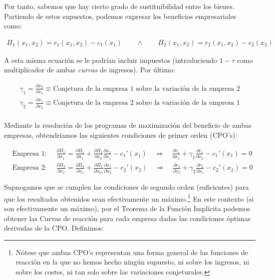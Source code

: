\documentclass[10pt,a4paper]{article}
\begin{document}
Por tanto, sabemos que hay cierto grado de sustituibilidad entre los bienes. Partiendo de estos supuestos, podemos expresar los beneficios empresariales como: 

$$\begin{aligned}
    \Pi_1(x_1,x_2)=r_1(x_1,x_2)-c_1(x_1)\qquad \wedge\qquad\Pi_2(x_1,x_2)=r_2(x_1,x_2)-c_2(x_2)
\end{aligned}$$

A esta misma ecuación se le podrían incluir impuestos (introduciendo $1-\tau$ como multiplicador de ambas \textit{curvas} de ingresos). Por último:

$$\begin{aligned}
    \gamma_1=\frac{\partial x_2}{\partial x_1}\equiv \text{Conjetura de la empresa 1 sobre la variación de la empresa 2}\\[1em]
    \gamma_2=\frac{\partial x_1}{\partial x_2}\equiv \text{Conjetura de la empresa 2 sobre la variación de la empresa 1}\\[1em]
\end{aligned}$$

Mediante la resolución de los programas de maximización del beneficio de ambas empresas, obtendríamos las siguientes condiciones de primer orden (CPO's): 

$$\begin{aligned}
    &\text{Empresa 1}:&&\frac{\partial \Pi_1}{\partial x_1}=\frac{\partial \Pi_1}{\partial x_1}+\frac{\partial\Pi_1}{\partial x_2}\frac{\partial x_2}{\partial x_1}-c_1'(x_1)\quad \Longrightarrow\quad \frac{\partial r_1}{\partial x_1}+\gamma_1\frac{\partial r_1}{\partial x_2}-c_1'(x_1)=0\\[1em]
    &\text{Empresa 2}:&&\frac{\partial \Pi_2}{\partial x_2}=\frac{\partial \Pi_2}{\partial x_2}+\frac{\partial\Pi_2}{\partial x_21}\frac{\partial x_1}{\partial x_2}-c_2'(x_2)\quad \Longrightarrow\quad \frac{\partial r_2}{\partial x_2}+\gamma_2\frac{\partial r_2}{\partial x_1}-c_2'(x_2)=0
\end{aligned}$$

Supnogamos que se cumplen las condiciones de segundo orden (suficientes) para que los resultados obtenidos sean efectivamente un máximo.\footnote{%
    Nótese que ambas CPO's representan una forma general de las funciones de reacción en la que no hemos hecho ningún supuesto, ni sobre los ingresos, ni sobre los costes, ni tan solo sobre las variaciones conjeturales.
} En este contexto (si son efectivamente un máximo), por el Teorema de la Función Implícita podemos obtener las Curvas de reacción para cada empresa dadas las condiciones óptimas derivadas de la CPO. Definimos: 
\end{document}

